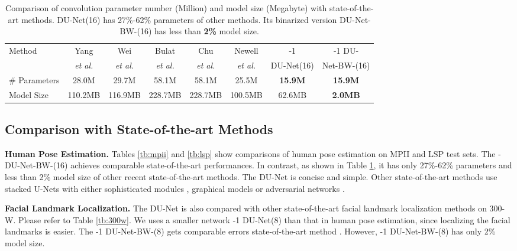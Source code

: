 \documentclass[runningheads]{llncs}
\begin{document}
\begin{table}[htb]
\begin{center}
\small
\caption{Comparison of convolution parameter number (Million) and model size (Megabyte) with state-of-the-art methods. DU-Net(16) has 27\%-62\% parameters of other methods. Its binarized version DU-Net-BW-(16) has less than {\bf 2\%} model size.}\label{tb:para-num}
\setlength\tabcolsep{0.5pt}
\begin{tabular}{lccccc|cc}
\toprule
\multirow{2}{*}{Method} & Yang  & Wei & Bulat  & Chu & Newell  & -1 & -1 DU-\\
& {\it et al.}\cite{yang2017learning} & {\it et al.}\cite{wei2016convolutional}  
& {\it et al.}\cite{bulat2016human} & {\it et al.}\cite{chu2017multi} & {\it et al.}\cite{newell2016stacked} & DU-Net(16) & Net-BW-(16)\\
\hline
\# Parameters & 28.0M & 29.7M & 58.1M & 58.1M & 25.5M & {\bf 15.9M} & {\bf 15.9M}\\
Model Size & 110.2MB & 116.9MB & 228.7MB & 228.7MB & 100.5MB & 62.6MB & {\bf 2.0MB}\\

\bottomrule
\end{tabular}
\end{center}
\end{table}

\subsection{Comparison with State-of-the-art Methods}



{\bf Human Pose Estimation.}
Tables \ref{tb:mpii} and \ref{tb:lsp} show comparisons of human pose estimation on MPII and LSP test sets. The -  DU-Net-BW-(16) achieves comparable state-of-the-art performances. In contrast, as shown in Table \ref{tb:para-num}, it has only 27\%-62\% parameters and less than 2\% model size of other recent state-of-the-art methods. The DU-Net is concise and simple. Other state-of-the-art methods use stacked U-Nets with either sophisticated modules \cite{yang2017learning}, graphical models \cite{chu2017multi} or adversarial networks \cite{yu2017adversarial}.

{\bf Facial Landmark Localization.}
The DU-Net is also compared with other state-of-the-art facial landmark localization methods on 300-W. Please refer to Table \ref{tb:300w}. We uses a smaller network -1 DU-Net(8) than that in human pose estimation, since localizing the facial landmarks is easier. The -1 DU-Net-BW-(8) gets comparable errors state-of-the-art method \cite{newell2016stacked}. However, -1 DU-Net-BW-(8) has only 2\% model size.
\end{document}
